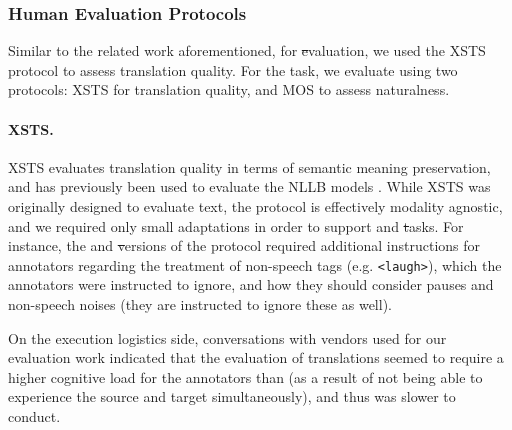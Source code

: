 \subsubsection{Human Evaluation Protocols} 

Similar to the related work aforementioned, for \st evaluation, we used the XSTS protocol to assess translation quality. For the \sst task, we evaluate using two protocols: XSTS for translation quality, and MOS to assess naturalness. 

\paragraph{XSTS.}  XSTS \citep{licht2022xsts} evaluates translation quality in terms of semantic meaning preservation, and has previously been used to evaluate the NLLB models \citep{nllb2022}.  While XSTS was originally designed to evaluate text, the protocol is effectively modality agnostic, and we required only small adaptations in order to support \sst and \st tasks.   For instance, the \sst and \st versions of the protocol required additional instructions for annotators regarding the treatment of non-speech tags (e.g. \texttt{<laugh>}), which the annotators were instructed to ignore, and how they should consider pauses and non-speech noises (they are instructed to ignore these as well).

On the execution logistics side, conversations with vendors used for our evaluation work indicated that the evaluation of \sst translations seemed to require a higher cognitive load for the annotators than \mt (as a result of not being able to experience the source and target simultaneously), and thus was slower to conduct. 



